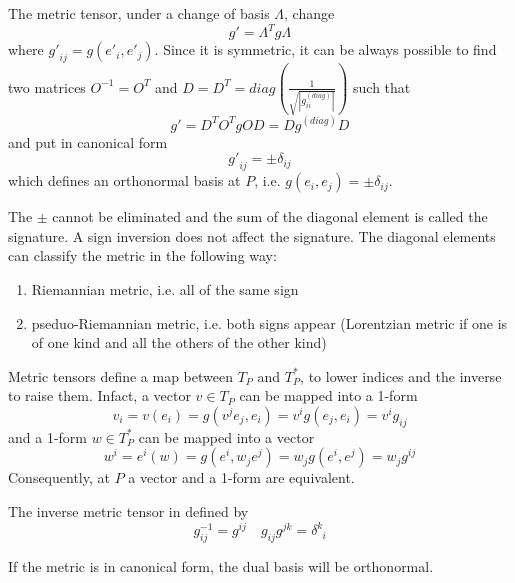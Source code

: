     The metric tensor, under a change of basis $\Lambda$, change 
    \begin{equation*}
        g' = \Lambda^T g \Lambda
    \end{equation*}
    where ${g'}_{ij} = g({e'}_i, {e'}_j)$. Since it is symmetric, it can be always possible to find two matrices $O^{-1} = O^{T}$ and $D = D^T = diag(\frac{1}{\sqrt{|g_{ii}^{(diag)}|}})$ such that 
    \begin{equation*}
        g' = D^T O^T g O D = D g^{(diag)} D 
    \end{equation*} 
    and put in canonical form
    \begin{equation*}
        {g'}_{ij} = \pm \delta_{ij}
    \end{equation*}
    which defines an orthonormal basis at $P$, i.e. $g(e_i, e_j) = \pm \delta_{ij}$. 

    The $\pm$ cannot be eliminated and the sum of the diagonal element is called the signature. A sign inversion does not affect the signature. The diagonal elements can classify the metric in the following way:
    \begin{enumerate}
        \item Riemannian metric, i.e. all of the same sign
        \item pseduo-Riemannian metric, i.e. both signs appear (Lorentzian metric if one is of one kind and all the others of the other kind)
    \end{enumerate}

    Metric tensors define a map between $T_P$ and $T^*_P$, to lower indices and the inverse to raise them. Infact, a vector $v \in T_P$ can be mapped into a 1-form
    \begin{equation*}
        v_i = v(e_i) = g(v^j e_j, e_i) = v^i g(e_j, e_i) = v^i g_{ij}
    \end{equation*}
    and a 1-form $w \in T^*_P$ can be mapped into a vector 
    \begin{equation*}
        w^i = e^i(w) = g(e^i, w_j e^j) = w_j g(e^i, e^j) = w_j g^{ij}
    \end{equation*}
    Consequently, at $P$ a vector and a 1-form are equivalent.

    
    The inverse metric tensor in defined by 
    \begin{equation*}
        g^{-1}_{ij} = g^{ij} \quad g_{ij} g^{jk} = \delta^k_{\phantom k i}
    \end{equation*}

    If the metric is in canonical form, the dual basis will be orthonormal. 

